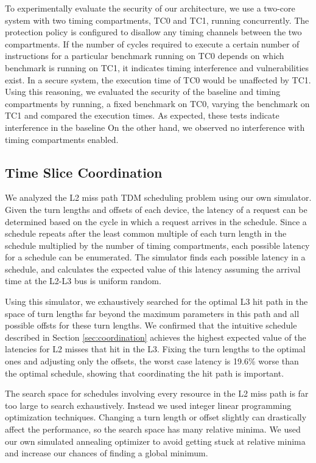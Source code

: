 To experimentally evaluate the security of our architecture, we use a two-core 
system with two timing compartments, TC0 and
TC1, running concurrently. The protection policy is configured to disallow any 
timing channels between the two compartments. If the number of cycles required 
to execute a certain number of instructions for a particular benchmark running
on TC0 depends on which benchmark is running on TC1, it indicates timing 
interference and vulnerabilities exist. In a secure system, the execution time
of TC0 would be unaffected by TC1. Using this reasoning, we evaluated the
security of the baseline and timing  compartments by running, a fixed benchmark
on TC0, varying the benchmark on TC1 and compared the execution times. As
expected, these tests indicate interference in the baseline On the other hand,
we observed no interference with timing compartments enabled.

\subsection{Time Slice Coordination}
\label{sec:eval_coord}
We analyzed the L2 miss path TDM scheduling problem using our own simulator.
Given the turn lengths and offsets of each device, the latency of a request can 
be determined based on the cycle in which a request arrives in the schedule.
Since a schedule repeats after the least common multiple of each turn length in 
the schedule multiplied by the number of timing compartments, each possible 
latency for a schedule can be enumerated. The simulator finds
each possible latency in a schedule, and calculates the expected value of this 
latency assuming the arrival time at the L2-L3 bus is uniform random.

Using this simulator, we exhaustively searched for the optimal L3 hit path in 
the space of turn lengths far beyond the maximum parameters in this path
and all possible offsts for these turn lengths.
We confirmed that the intuitive schedule described in 
Section \ref{sec:coordination} achieves the highest expected value of the 
latencies for L2 misses that hit in the L3.
Fixing the turn lengths to the optimal ones and adjusting only the offsets,
the worst case latency is 19.6\% worse than the optimal schedule, showing
that coordinating the hit path is important.

The search space for schedules involving every resource in the L2 miss path
is far too large to search exhaustively.
Instead we used integer linear programming optimization techniques. Changing a 
turn length or offset slightly can drastically affect the performance, so the 
search space has many relative minima. We used our own simulated annealing 
optimizer to avoid getting stuck at relative minima and increase our chances of 
finding a global minimum.

